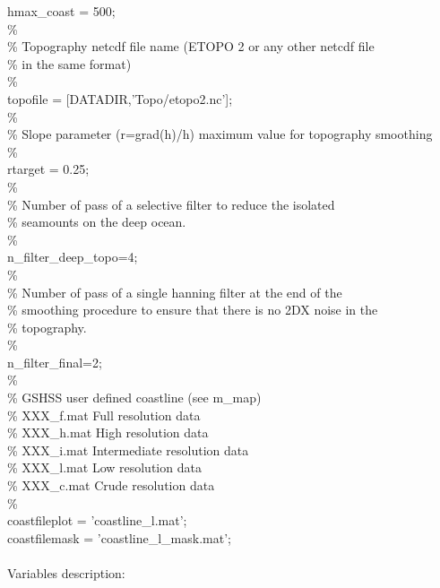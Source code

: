 hmax\_coast = 500;\\
\%\\
\%  Topography netcdf file name (ETOPO 2 or any other netcdf file\\
\%  in the same format)\\
\%\\
topofile = [DATADIR,'Topo/etopo2.nc'];\\
\%\\
\% Slope parameter (r=grad(h)/h) maximum value for topography smoothing\\
\%\\
rtarget = 0.25;\\
\%\\
\% Number of pass of a selective filter to reduce the isolated\\
\% seamounts on the deep ocean.\\
\%\\
n\_filter\_deep\_topo=4;\\
\%\\
\% Number of pass of a single hanning filter at the end of the\\
\% smoothing procedure to ensure that there is no 2DX noise in the \\
\% topography.\\
\%\\
n\_filter\_final=2;\\
\%\\
\%  GSHSS user defined coastline (see m\_map) \\
\%  XXX\_f.mat    Full resolution data\\
\%  XXX\_h.mat    High resolution data\\
\%  XXX\_i.mat    Intermediate resolution data\\
\%  XXX\_l.mat    Low resolution data\\
\%  XXX\_c.mat    Crude resolution data\\
\%\\
coastfileplot = 'coastline\_l.mat';\\
coastfilemask = 'coastline\_l\_mask.mat';\\
\\
Variables description:
